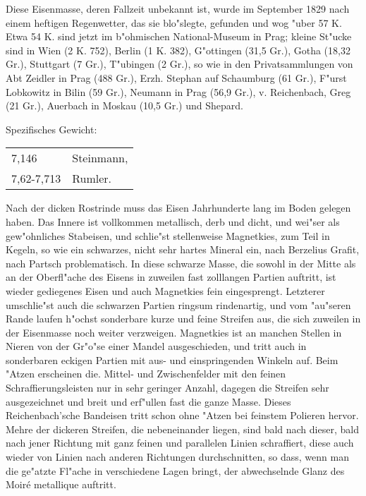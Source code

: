 \documentclass[a4paper, 11pt, oneside]{article}
\begin{document}
Diese Eisenmasse, deren Fallzeit unbekannt ist, wurde im September 1829 nach einem heftigen Regenwetter, das sie blo"slegte, gefunden und wog "uber 57 K. Etwa 54 K. sind jetzt im b"ohmischen National-Museum in Prag; kleine St"ucke sind in Wien (2 K. 752), Berlin (1 K. 382), G"ottingen (31,5 Gr.), Gotha (18,32 Gr.), Stuttgart (7 Gr.), T"ubingen (2 Gr.), so wie in den Privatsammlungen von Abt Zeidler in Prag (488 Gr.), Erzh. Stephan auf Schaumburg (61 Gr.), F"urst Lobkowitz in Bilin (59 Gr.), Neumann in Prag (56,9 Gr.), v. Reichenbach, Greg (21 Gr.), Auerbach in Moskau (10,5 Gr.) und Shepard.

Spezifisches Gewicht:  
\begin{table}[!ht]
    \centering\swabfamily\Large
    \begin{tabular}{l l}
        7,146 & Steinmann,\\
        7,62-7,713 & Rumler.
    \end{tabular}
\end{table}

Nach der dicken Rostrinde muss das Eisen Jahrhunderte lang im Boden gelegen haben. Das Innere ist vollkommen metallisch, derb und dicht, und wei"ser als gew"ohnliches Stabeisen, und schlie"st stellenweise Magnetkies, zum Teil in Kegeln, so wie ein schwarzes, nicht sehr hartes Mineral ein, nach Berzelius Grafit, nach Partsch problematisch. In diese schwarze Masse, die sowohl in der Mitte als an der Oberfl"ache des Eisens in zuweilen fast zolllangen Partien auftritt, ist wieder gediegenes Eisen und auch Magnetkies fein eingesprengt. Letzterer umschlie"st auch die schwarzen Partien ringsum rindenartig, und vom "au"seren Rande laufen h"ochst sonderbare kurze und feine Streifen aus, die sich zuweilen in der Eisenmasse noch weiter verzweigen. Magnetkies ist an manchen Stellen in Nieren von der Gr"o"se einer Mandel ausgeschieden, und tritt auch in sonderbaren eckigen Partien mit aus- und einspringenden Winkeln auf. Beim "Atzen erscheinen die. Mittel- und Zwischenfelder mit den feinen Schraffierungsleisten nur in sehr geringer Anzahl, dagegen die Streifen sehr ausgezeichnet und breit und erf"ullen fast die ganze Masse. Dieses Reichenbach'sche Bandeisen tritt schon ohne "Atzen bei feinstem Polieren hervor. Mehre der dickeren Streifen, die nebeneinander liegen, sind bald nach dieser, bald nach jener Richtung mit ganz feinen und parallelen Linien schraffiert, diese auch wieder von Linien nach anderen Richtungen durchschnitten, so dass, wenn man die ge"atzte Fl"ache in verschiedene Lagen bringt, der abwechselnde Glanz des Moiré metallique auftritt.
\end{document}
